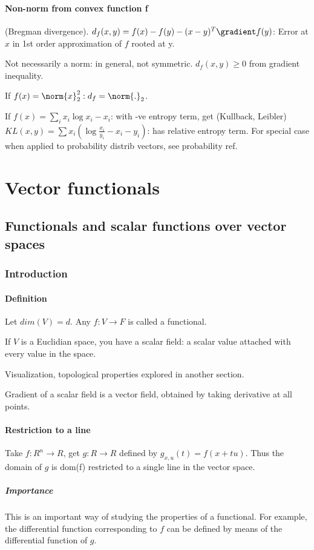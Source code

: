 \documentclass[oneside, article]{memoir}
\begin{document}
\subsection{Non-norm from convex function f}
(Bregman divergence). $d_f(x, y) = f(x) - f(y) - (x-y)^{T}\gradient f(y)$: Error at $x$ in 1st order approximation of $f$ rooted at y.

Not necessarily a norm: in general, not symmetric. $d_f(x, y) \geq 0$ from gradient inequality.

If $f(x) = \norm{x}_2^{2}: d_f = \norm{.}_2$.

If $f(x) = \sum_{i}x_i \log x_i - x_i$: with -ve entropy term, get (Kullback, Leibler) $KL(x, y) = \sum x_i (\log \frac{x_i}{y_i} - x_i - y_i)$: has relative entropy term. For special case when applied to probability distrib vectors, see probability ref.

\part{Vector functionals}
\chapter{Functionals and scalar functions over vector spaces}
\section{Introduction}
\subsection{Definition}
Let $dim(V) = d$. Any $f:V \to F$ is called a functional.

If $V$ is a Euclidian space, you have a scalar field: a scalar value attached with every value in the space.

Visualization, topological properties explored in another section.

Gradient of a scalar field is a vector field, obtained by taking derivative at all points.

\subsection{Restriction to a line}
Take $f: R^{n} \to R$, get $g: R \to R$ defined by $g_{x,u}(t) = f(x + tu)$. Thus the domain of $g$ is dom(f) restricted to a single line in the vector space.

\subsubsection{Importance}
This is an important way of studying the properties of a functional. For example, the differential function corresponding to $f$ can be defined by means of the differential function of $g$.
\end{document}
